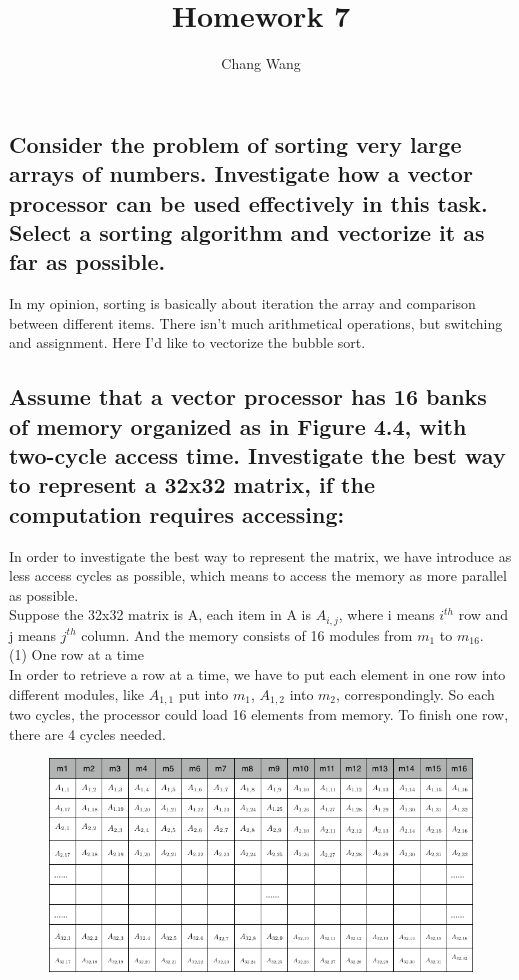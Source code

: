 \documentclass[12pt]{report}
\title{Homework 7}
\author{Chang Wang}
\begin{document}
\maketitle

\subsection{Consider the problem of sorting very large arrays of numbers. Investigate how a vector processor can be used effectively in this task. Select a sorting algorithm and vectorize it as far as possible.}
In my opinion, sorting is basically about iteration the array and comparison between different items. There isn't much arithmetical operations, but switching and assignment.
Here I'd like to vectorize the bubble sort.

\subsection{Assume that a vector processor has 16 banks of memory organized as in Figure 4.4, with two-cycle access time. Investigate the best way to represent a 32x32 matrix, if the computation requires accessing:}
In order to investigate the best way to represent the matrix, we have introduce as less access cycles as possible, which means to access the memory as more parallel as possible. \\
Suppose the 32x32 matrix is A, each item in A is $A_{i,j}$, where i means $i^{th}$ row and j means $j^{th}$ column. And the memory consists of 16 modules from $m_{1}$ to $m_{16}$.\\
(1) One row at a time \\
In order to retrieve a row at a time, we have to put each element in one row into different modules, like $A_{1,1}$ put into $m_{1}$, $A_{1,2}$ into $m_{2}$, correspondingly. So each two cycles, the processor could load 16 elements from memory. To finish one row, there are 4 cycles needed. \\
\begin{figure}[]
\begin{center}
\includegraphics[scale=0.5]{row.png}
\end{center}
\end{figure}
\end{document}
